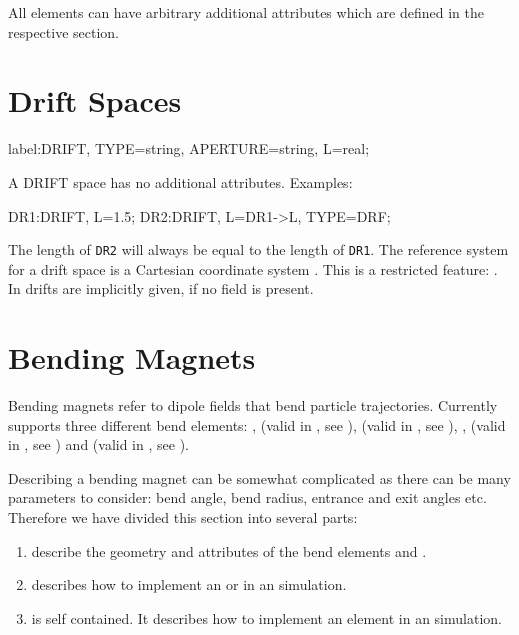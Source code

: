 \begin{kdescription}
\end{kdescription}

All elements can have arbitrary additional attributes which are defined in the respective section.

\clearpage

\section{Drift Spaces}
\label{sec:drift}
\begin{example}
label:DRIFT, TYPE=string, APERTURE=string, L=real;
\end{example}
A DRIFT space has no additional attributes.
\noindent Examples:
\begin{example}
DR1:DRIFT, L=1.5;
DR2:DRIFT, L=DR1->L, TYPE=DRF;
\end{example}
The length of \texttt{DR2} will always be equal to the length of \texttt{DR1}.
The reference system for a drift space is a Cartesian coordinate system
.
This is a restricted feature: \noopalcycl. In \opalt drifts are implicitly given, if no field is present.



\clearpage
\section{Bending Magnets}
\label{sec:bend}
Bending magnets refer to dipole fields that bend particle trajectories. Currently \opal supports three different
bend elements: , (valid in \opalt, see ),  (valid in \opalt, see
), , (valid in \opalt, see ) and  (valid in
\opalcycl, see ).

Describing a bending magnet can be somewhat complicated as there can be many parameters to consider: bend angle,
bend radius, entrance and exit angles etc. Therefore we have divided this section into several parts:

\begin{enumerate}
\item {} describe the geometry and attributes of the \opalt bend
  elements  and .
\item {} describes how to implement an  or  in an
  \opalt simulation.
\item {} is self contained. It describes how to implement an  element in
  an \opalcycl simulation.
\end{enumerate}

